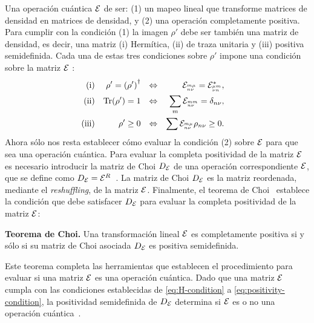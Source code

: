 Una operación cuántica $\mathcal{E}$ de ser: (1) un mapeo lineal que
transforme matrices de densidad en matrices de densidad, y (2) una 
operación completamente positiva. 
Para cumplir con la condición (1) la imagen $\rho'$ debe ser también 
una matriz de densidad, es decir, una matriz (i) Hermítica, 
(ii) de traza unitaria y (iii) positiva semidefinida. 
Cada una de estas tres condiciones sobre $\rho'$ impone una condición 
sobre la matriz $\mathcal{E}$ \cite{bengtsson_zyczkowski_2017}:
\begin{align}
\text{(i)}&& \rho'=\qty(\rho')^{\dagger}&&\Leftrightarrow
    && \mathcal{E}_{{}^{m\mu}_{n\nu}}=\mathcal{E}_{{}^{\mu m}_{\nu n}}^*,&&
    \label{eq:H-condition}\\
\text{(ii)}&&\Tr(\rho')=1
    &&\Leftrightarrow&&  \sum_{m}\mathcal{E}_{{}^{mm}_{n\nu}}=\delta_{n\nu},\\     
\text{(iii)}&&\rho'\geq0
    &&\Leftrightarrow&&  \sum\mathcal{E}_{{}^{m\mu}_{n\nu}}\rho_{n\nu}\geq0.
    \label{eq:positivity-condition}
\end{align}
 
Ahora sólo nos resta establecer cómo evaluar la condición (2) sobre $\mathcal{E}$
para que sea una operación cuántica. 
Para evaluar la completa positividad de la matriz $\mathcal{E}$
es necesario introducir la matriz de Choi $D_{\mathcal{E}}$ 
de una operación correspondiente $\mathcal{E}$, que se define como 
$D_{\mathcal{E}}=\mathcal{E}^{R}$~\cite{bengtsson_zyczkowski_2017}.
La matriz de Choi $D_{\mathcal{E}}$ es la matriz reordenada, mediante
el \textit{reshuffling}, de la matriz $\mathcal{E}$. 
Finalmente, el teorema de Choi~\cite{bengtsson_zyczkowski_2017}
establece la condición que debe satisfacer $D_{\mathcal{E}}$ para 
evaluar la completa positividad de la matriz $\mathcal{E}$:
\begin{teorema}{\textbf{Teorema de Choi.}}
Una transformación lineal $\mathcal{E}$ es completamente positiva si y sólo si 
su matriz de Choi asociada $D_{\mathcal{E}}$ es positiva semidefinida.
\end{teorema}
Este teorema completa las herramientas que establecen el procedimiento 
para evaluar si una matriz $\mathcal{E}$ es una operación cuántica. 
Dado que una matriz $\mathcal{E}$ cumpla con las condiciones establecidas de
\eqref{eq:H-condition} a \eqref{eq:positivity-condition}, la positividad
semidefinida de $D_{\mathcal{E}}$ determina si $\mathcal{E}$ es 
o no una operación cuántica~\cite{bengtsson_zyczkowski_2017}.

